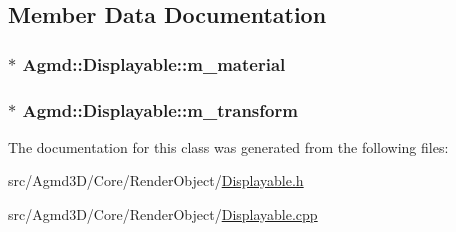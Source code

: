 \subsection{Member Data Documentation}
\hypertarget{class_agmd_1_1_displayable_a44445692b08ae4e9bd9dae50466444c5}{
\subsubsection[{m\+\_\+material}]{$\ast$ Agmd\+::\+Displayable\+::m\+\_\+material\hspace{0.3cm}{\ttfamily [protected]}}}\label{class_agmd_1_1_displayable_a44445692b08ae4e9bd9dae50466444c5}
\hypertarget{class_agmd_1_1_displayable_a7d97ac7c8eb5339dc1fa41222a2fb14c}{
\subsubsection[{m\+\_\+transform}]{$\ast$ Agmd\+::\+Displayable\+::m\+\_\+transform\hspace{0.3cm}{\ttfamily [protected]}}}\label{class_agmd_1_1_displayable_a7d97ac7c8eb5339dc1fa41222a2fb14c}


The documentation for this class was generated from the following files\+:\begin{DoxyCompactItemize}
\item 
src/\+Agmd3\+D/\+Core/\+Render\+Object/\hyperlink{_displayable_8h}{Displayable.\+h}\item 
src/\+Agmd3\+D/\+Core/\+Render\+Object/\hyperlink{_displayable_8cpp}{Displayable.\+cpp}\end{DoxyCompactItemize}
